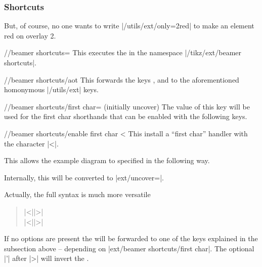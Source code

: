 \subsubsection{\Beamer Shortcuts}
But, of course, no one wants to write |/utils/ext/only={2}{red}| to
make an element red on overlay 2.
\begin{key}{/\tikzext/beamer shortcuts=}
  This executes the  in the namespace |/tikz/ext/beamer shortcuts|.
\end{key}
\begin{key}{/\tikzext/beamer shortcuts/aot}
  This forwards the keys , 
  and  to the aforementioned homonymous |/utils/ext| keys.
\end{key}
\begin{key}{/\tikzext/beamer shortcuts/first char=%
   (initially uncover)}
  The value of this key will be used for the first char shorthands that can be enabled with the following keys.
\begin{key}{/\tikzext/beamer shortcuts/enable first char <}
  This install a \enquote{first char} handler with the character |<|.
  
  This allows the example diagram to specified in the following way.
\begin{codeexample}[preamble=\usetikzlibrary{ext.beamer} \setbeamercovered{transparent},code only]
\end{codeexample}

  Internally, this will be converted to |ext/uncover=|.
  
  Actually, the full syntax is much more versatile
  \begin{quote}
      |<||>|\\
      |<||>|
  \end{quote}
  
  If no options are present the  will
  be forwarded to one of the keys explained in the subsection above
  -- depending on |ext/beamer shortcuts/first char|.
  The optional |'| after |>| will invert the .
  

\end{key}
\end{key}
